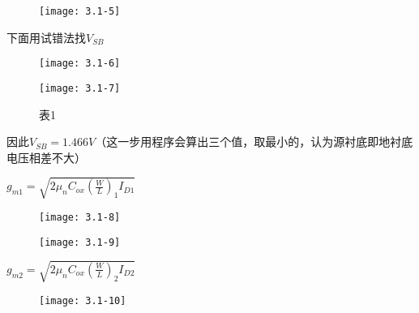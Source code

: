 {	\begin{figure}[H] %
		\begin{minipage}{\linewidth}
			\texttt{[image: 3.1-5]}
		\end{minipage}
	\end{figure}
	
	下面用试错法找$V_{SB}$
	
	\begin{figure}[H] %
		\begin{minipage}{\linewidth}
			\texttt{[image: 3.1-6]}
		\end{minipage}
	\end{figure}
	
			\begin{figure}[H] %
		\begin{minipage}{\linewidth}
			\texttt{[image: 3.1-7]}
		\end{minipage}
		\caption*{表1} %
	\end{figure}
	
	
	
	因此$V_{SB}=1.466V$（这一步用程序会算出三个值，取最小的，认为源衬底即地衬底电压相差不大）
	
	$g_{m1}=\sqrt{2\mu_nC_{ox}(\frac{W}{L})_1I_{D1}}$
	
	\begin{figure}[H] %
		\begin{minipage}{\linewidth}
			\texttt{[image: 3.1-8]}
		\end{minipage}
	\end{figure}
	
	\begin{figure}[H] %
		\begin{minipage}{\linewidth}
			\texttt{[image: 3.1-9]}
		\end{minipage}
	\end{figure}
	
	$g_{m2}=\sqrt{2\mu_nC_{ox}(\frac{W}{L})_2I_{D2}}$
	
	\begin{figure}[H] %
		\begin{minipage}{\linewidth}
			\texttt{[image: 3.1-10]}
		\end{minipage}
	\end{figure}
	
}
